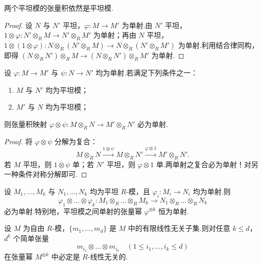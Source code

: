 \begin{theorem}\label{thm:flat-tensor-flat}
两个平坦模的张量积依然是平坦模.
\end{theorem}

\begin{proof}
设 $N$ 与 $N'$ 平坦，$\varphi \colon M \to M'$ 为单射.由 $N'$ 平坦，$1 \otimes \varphi \colon N' \otimes_R M \to N' \otimes_R M'$ 为单射；再由 $N$ 平坦，$1 \otimes (1 \otimes \varphi) \colon N \otimes_R (N' \otimes_R M) \to N \otimes_R (N' \otimes_R M')$ 为单射.利用结合律同构，即得 $(N \otimes_R N') \otimes_R M \to (N \otimes_R N') \otimes_R M'$ 为单射.
\end{proof}

\begin{theorem}[双边映射单射判别准则]\label{thm:injective-tensor-both}
设 $\varphi \colon M \to M'$ 与 $\psi \colon N \to N'$ 均为单射.若满足下列条件之一：
\begin{enumerate}
  \item $M$ 与 $N'$ 均为平坦模；
  \item $M'$ 与 $N$ 均为平坦模；
\end{enumerate}
则张量积映射 $\varphi \otimes \psi \colon M \otimes_R N \to M' \otimes_R N'$ 必为单射.
\end{theorem}

\begin{proof}
将 $\varphi \otimes \psi$ 分解为复合：
\[
  M \otimes_R N \xrightarrow{1 \otimes \psi} M \otimes_R N' \xrightarrow{\varphi \otimes 1} M' \otimes_R N'.
\]
若 $M$ 平坦，则 $1 \otimes \psi$ 单；若 $N'$ 平坦，则 $\varphi \otimes 1$ 单.两单射之复合必为单射！对另一种条件对称分解即可.
\end{proof}

\begin{corollary}\label{cor:flat-tensor-powers-injective}
设 $M_1, \dots, M_k$ 与 $N_1, \dots, N_k$ 均为平坦 $R$-模，且 $\varphi_i \colon M_i \to N_i$ 均为单射.则
\[
  \varphi_1 \otimes \dots \otimes \varphi_k \colon M_1 \otimes_R \dots \otimes_R M_k \to N_1 \otimes_R \dots \otimes_R N_k
\]
必为单射.特别地，平坦模之间单射的张量幂 $\varphi^{\otimes k}$ 恒为单射.
\end{corollary}

\begin{corollary}\label{cor:free-independent-tensors}
设 $M$ 为自由 $R$-模，$\{m_1, \dots, m_d\}$ 是 $M$ 中的有限线性无关子集.则对任意 $k \leq d$，$d^k$ 个简单张量
\[
  m_{i_1} \otimes \dots \otimes m_{i_k} \quad (1 \leq i_1, \dots, i_k \leq d)
\]
在张量幂 $M^{\otimes k}$ 中必定是 $R$-线性无关的.
\end{corollary}
